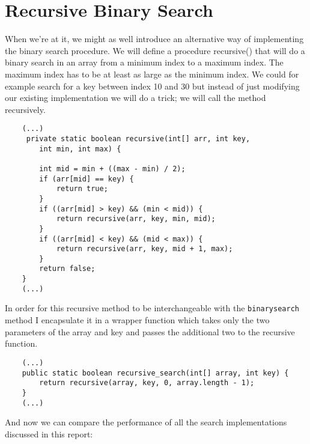 \documentclass[a4paper,11pt]{article}
\begin{document}
\section*{Recursive Binary Search}

When we’re at it, we might as well introduce an alternative way of implementing the binary search procedure. We will define a procedure recursive()
that will do a binary search in an array from a minimum index to a maximum index. The maximum index has to be at least as large as the minimum
index. We could for example search for a key between index 10 and 30 but
instead of just modifying our existing implementation we will do a trick; we
will call the method recursively.

\begin{verbatim}
    (...)
     private static boolean recursive(int[] arr, int key, 
        int min, int max) {
        
        int mid = min + ((max - min) / 2);
        if (arr[mid] == key) {
            return true;
        }
        if ((arr[mid] > key) && (min < mid)) {
            return recursive(arr, key, min, mid);
        }
        if ((arr[mid] < key) && (mid < max)) {
            return recursive(arr, key, mid + 1, max);
        }
        return false;
    }
    (...)
\end{verbatim}

In order for this recursive method to be interchangeable with the {\tt binary\textunderscore search} method I encapsulate it in a wrapper function which takes only the two parameters of the array and key and passes the additional two to the recursive function.

\begin{verbatim}
    (...)
    public static boolean recursive_search(int[] array, int key) {
        return recursive(array, key, 0, array.length - 1);
    }
    (...)
\end{verbatim}

And now we can compare the performance of all the search implementations discussed in this report:
\end{document}
